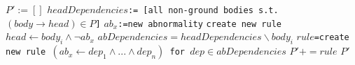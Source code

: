 \documentclass{article}
\begin{document}
\begin{algorithm}
\begin{algorithmic}[1]
\State \texttt{$P':=[]$}
\State \texttt{$headDependencies$:= [all non-ground bodies s.t.$(body \rightarrow head) \in P$]}
\State \texttt{$ab_{x}$:=new abnormality} 
\State \texttt{create new rule $head \leftarrow body_i \land \lnot ab_x$} 
\State \texttt {$abDependencies = headDependencies \backslash body_i$}
\State \texttt{$rule$=create new rule $(ab_x \leftarrow dep_1 \land ... \land dep_n)$ for $dep \in abDependencies$}
\State $P'+=rule$
\EndFor
\EndFor
\State \Return $P'$
\EndFunction
\end{algorithmic}
\label{alg:addAbnormalities}
\end{algorithm}
\end{document}
